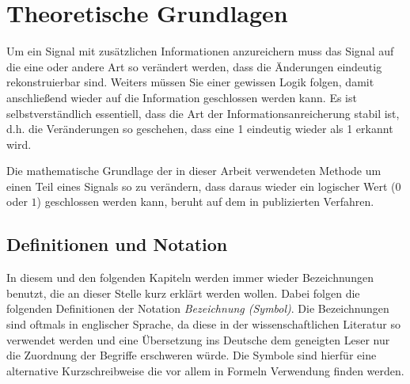 \chapter{Theoretische Grundlagen}
\label{ch:theorie}

	Um ein Signal mit zus\"atzlichen Informationen anzureichern muss das Signal auf die eine oder andere Art so ver\"andert werden, dass die Änderungen eindeutig rekonstruierbar sind. Weiters m\"ussen Sie einer gewissen Logik folgen, damit anschlie{\ss}end wieder auf die Information geschlossen werden kann. Es ist selbstverst\"andlich essentiell, dass die Art der Informationsanreicherung stabil ist, d.h. die Ver\"anderungen so geschehen, dass eine 1 eindeutig wieder als 1 erkannt wird.
	
	Die mathematische Grundlage der in dieser Arbeit verwendeten Methode um einen Teil eines Signals so zu verändern, dass daraus wieder ein logischer Wert ($0$ oder $1$) geschlossen werden kann, beruht auf dem in \cite{xiang2007robust} publizierten Verfahren.  

\section{Definitionen und Notation}

In diesem und den folgenden Kapiteln werden immer wieder Bezeichnungen benutzt, die an dieser Stelle kurz erkl\"art werden wollen. Dabei folgen die folgenden Definitionen der Notation \textit{Bezeichnung (Symbol)}. Die Bezeichnungen sind oftmals in englischer Sprache, da diese in der wissenschaftlichen Literatur so verwendet werden und eine Übersetzung ins Deutsche dem geneigten Leser nur die Zuordnung der Begriffe erschweren w\"urde. Die Symbole sind hierf\"ur eine alternative Kurzschreibweise die vor allem in Formeln Verwendung finden werden. 

